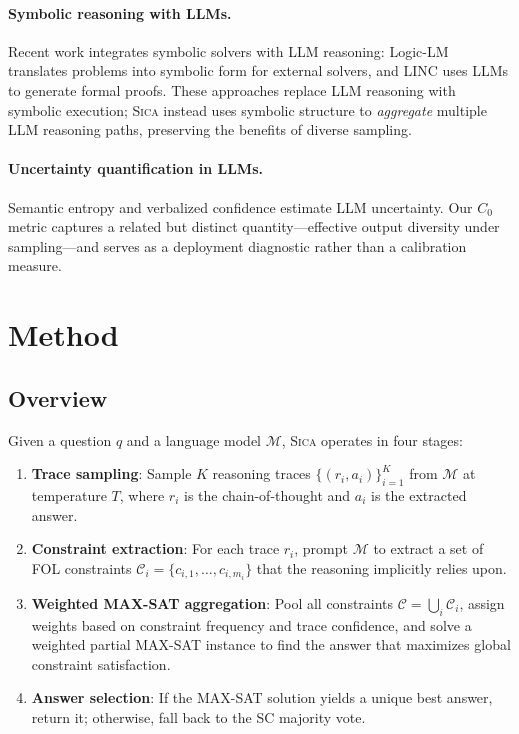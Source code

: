 \documentclass[11pt,a4paper]{article}
\newcommand{\sica}{\textsc{Sica}}
\newcommand{\czero}{C_0}
\begin{document}
\paragraph{Symbolic reasoning with LLMs.}
Recent work integrates symbolic solvers with LLM reasoning: Logic-LM \cite{pan2023logiclm} translates problems into symbolic form for external solvers, and LINC \cite{olausson2023linc} uses LLMs to generate formal proofs.
These approaches replace LLM reasoning with symbolic execution; \sica{} instead uses symbolic structure to \emph{aggregate} multiple LLM reasoning paths, preserving the benefits of diverse sampling.

\paragraph{Uncertainty quantification in LLMs.}
Semantic entropy \cite{kuhn2023semantic} and verbalized confidence \cite{xiong2024llms} estimate LLM uncertainty.
Our $\czero{}$ metric captures a related but distinct quantity---effective output diversity under sampling---and serves as a deployment diagnostic rather than a calibration measure.


\section{Method}
\label{sec:method}

\subsection{Overview}

Given a question $q$ and a language model $\mathcal{M}$, \sica{} operates in four stages:

\begin{enumerate}[nosep,leftmargin=*]
  \item \textbf{Trace sampling}: Sample $K$ reasoning traces $\{(r_i, a_i)\}_{i=1}^{K}$ from $\mathcal{M}$ at temperature $T$, where $r_i$ is the chain-of-thought and $a_i$ is the extracted answer.
  \item \textbf{Constraint extraction}: For each trace $r_i$, prompt $\mathcal{M}$ to extract a set of FOL constraints $\mathcal{C}_i = \{c_{i,1}, \ldots, c_{i,m_i}\}$ that the reasoning implicitly relies upon.
  \item \textbf{Weighted MAX-SAT aggregation}: Pool all constraints $\mathcal{C} = \bigcup_i \mathcal{C}_i$, assign weights based on constraint frequency and trace confidence, and solve a weighted partial MAX-SAT instance to find the answer that maximizes global constraint satisfaction.
  \item \textbf{Answer selection}: If the MAX-SAT solution yields a unique best answer, return it; otherwise, fall back to the SC majority vote.
\end{enumerate}
\end{document}
